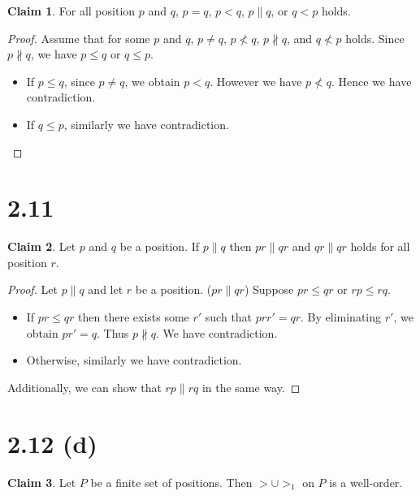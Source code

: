 \documentclass[autodetect-enginem]{article}
\theoremstyle{plain}
\theoremstyle{definition}
\theoremstyle{definition}
\newtheorem*{claim}{Claim}
\begin{document}
\begin{claim}
    For all position $p$ and $q$, $p=q$, $p < q$, $p \parallel q$, or $q < p$ holds.
\end{claim}

\begin{proof}
    Assume that for some $p$ and $q$,
    $p\neq q$, $p \nless q$, $p \nparallel q$, and $q \nless p$ holds.
    Since $p \nparallel q$, we have $p \leqslant q$ or $q \leqslant p$.
    \begin{itemize}
        \item If $p \leqslant q$, since $p \neq q$, we obtain $p < q$.
            However we have $p \nless q$. Hence we have contradiction.
        \item If $q \leqslant p$, similarly we have contradiction.
    \end{itemize}
\end{proof}

\section*{2.11}
\begin{claim}
    Let $p$ and $q$ be a position.
    If $p \parallel q$ then $pr \parallel qr$ and $qr \parallel qr$ holds for all position $r$.
\end{claim}

\begin{proof}
    Let $p \parallel q$ and let $r$ be a position.
    ($pr \parallel qr$)
    Suppose $pr \leqslant qr$ or $rp \leqslant rq$.
    \begin{itemize}
        \item If $pr \leqslant qr$ then there exists some $r'$ such that $prr' = qr$.
            By eliminating $r'$, we obtain $pr' = q$. Thus $p \nparallel q$. We have contradiction.
        \item Otherwise, similarly we have contradiction.
    \end{itemize}
    Additionally, we can show that $rp \parallel rq$ in the same way.
\end{proof}

\section*{2.12 (d)}

\begin{claim}
    Let $P$ be a finite set of positions.
    Then $> \cup >_1$ on $P$ is a well-order.
\end{claim}
\end{document}
